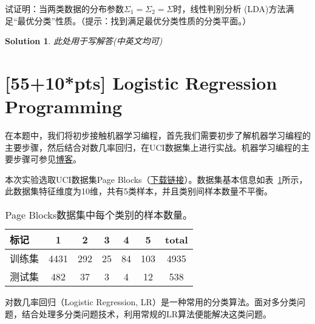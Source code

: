 \documentclass[a4paper,UTF8]{article}
\numberwithin{equation}{section}
\newtheorem*{solution}{Solution}
\begin{document}
试证明：当两类数据的分布参数$\Sigma_1=\Sigma_2=\Sigma$时，线性判别分析 (LDA)方法满足“最优分类”性质。（提示：找到满足最优分类性质的分类平面。）
\begin{solution}
	此处用于写解答(中英文均可)
\end{solution}
\newpage



\section{[55+10*pts] Logistic Regression Programming}
在本题中，我们将初步接触机器学习编程，首先我们需要初步了解机器学习编程的主要步骤，然后结合对数几率回归，在UCI数据集上进行实战。机器学习编程的主要步骤可参见\href{http://blog.csdn.net/cqy_chen/article/details/78690975}{博客}。

本次实验选取UCI数据集Page Blocks（\href{http://lamda.nju.edu.cn/ml2018/PS2/PS2_dataset.zip}{下载链接}）。数据集基本信息如表~\ref{data_inf}所示，此数据集特征维度为10维，共有5类样本，并且类别间样本数量不平衡。

\begin{table}[!h]
	\centering
	\caption{Page Blocks数据集中每个类别的样本数量。}\vspace{3mm}
	\label{data_inf}
	\begin{tabular}{l|cccccc}\hline
		标记     & 1    & 2   & 3  & 4  & 5   & total \\ \hline
		训练集   & 4431 & 292 & 25 & 84 & 103 & 4935  \\
		测试集   & 482  & 37  & 3  & 4  & 12  & 538   \\ \hline
	\end{tabular}
\end{table}

对数几率回归（Logistic Regression, LR）是一种常用的分类算法。面对多分类问题，结合处理多分类问题技术，利用常规的LR算法便能解决这类问题。
\end{document}
